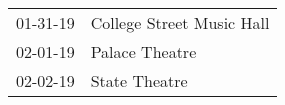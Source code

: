 \begin{supertabular}{p{0.25\columnwidth}p{0.75\columnwidth}}
 01-31-19 &  College Street Music Hall \\
 02-01-19 &             Palace Theatre \\
 02-02-19 &              State Theatre \\
\end{supertabular}
